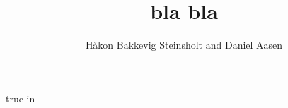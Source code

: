 \documentclass[12pt,letterpaper,final]{report}
\author{Håkon Bakkevig Steinsholt and Daniel Aasen}
\title{bla bla}
\theoremstyle{definition}
\begin{document}
   \maketitle

    \newpage    

    \tableofcontents
    \listoffigures
    \listoftables

     true in

    \newpage

        
                
    
    
    
    
    
    

    \begin{singlespace}
        
        
    \end{singlespace}

    \printglossary   
\end{document}
